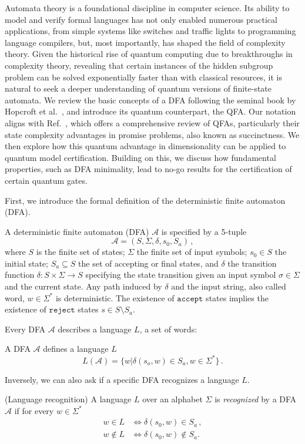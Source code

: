 \documentclass[../main.tex]{subfiles}
\begin{document}
Automata theory is a foundational discipline in computer science. Its ability to model and verify formal languages has not only enabled numerous practical applications, from simple systems like switches and traffic lights to programming language compilers, but, most importantly, has shaped the field of complexity theory. Given the historical rise of quantum computing due to breakthroughs in complexity theory, revealing that certain instances of the hidden subgroup problem can be solved exponentially faster than with classical resources, it is natural to seek a deeper understanding of quantum versions of finite-state automata. We review the basic concepts of a \ac{DFA} following the seminal book by Hopcroft et al.~\cite{hopcroft2001introduction}, and introduce its quantum counterpart, the \ac{QFA}. Our notation aligns with Ref.~\cite{zheng2017promise}, which offers a comprehensive review of \ac{QFA}s, particularly their state complexity advantages in promise problems, also known as succinctness. We then explore how this quantum advantage in dimensionality can be applied to quantum model certification. Building on this, we discuss how fundamental properties, such as \ac{DFA} minimality, lead to no-go results for the certification of certain quantum gates.

First, we introduce the formal definition of the deterministic finite automaton (DFA).
\begin{definition}\label{def:dfa} A deterministic finite automaton (DFA) $\mathcal{A}$ is specified by a 5-tuple 
\begin{equation}
    \mathcal{A} = (S, \Sigma, \delta, s_0, S_a) \, ,
\end{equation}
where $S$ is the finite set of states; $\Sigma$ the finite set of input symbols; $s_0 \in S$ the initial state; $S_a \subseteq S$ the set of accepting or final  states, and $\delta$ the transition function $\delta: S \times \Sigma \rightarrow S$ specifying the state transition given an input symbol $\sigma \in  \Sigma$ and the current state. Any path induced by $\delta$ and the input string, also called word, $w \in \Sigma^*$ is deterministic. The existence of $\mathtt{accept}$ states implies the existence of $\mathtt{reject}$  states $s \in S \setminus S_a$.
\end{definition}
Every DFA $\mathcal{A}$ describes a language $L$, a set of words:
\begin{definition} A DFA $\mathcal{A}$ defines a language $L$
    \begin{equation}
    L(\mathcal{A}) = \{ w | \delta(s_o,w) \in S_a, w \in \Sigma^* \} \, .
\end{equation}
\end{definition}
Inversely, we can also ask if a specific DFA recognizes a language $L$.
\begin{definition} (Language recognition)
    A language $L$ over an alphabet $\Sigma$ is \textit{recognized} by a DFA $\mathcal{A}$ if for every $w \in \Sigma^*$
    \begin{align}
        w \in L &\iff \delta (s_0,w) \in S_a \, , \\
        w \notin L &\iff \delta (s_0,w) \notin S_a  .
    \end{align}
\end{definition}
\end{document}
